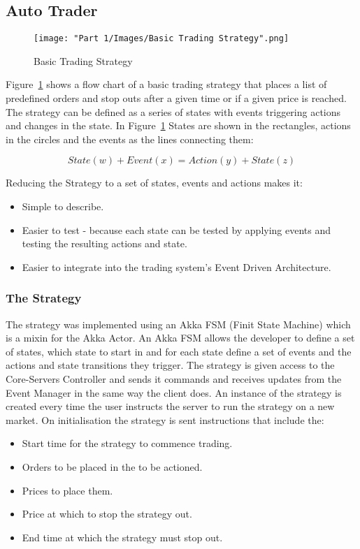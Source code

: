	\subsection{Auto Trader}
	\begin{figure}[H]
		\texttt{[image: "Part 1/Images/Basic Trading Strategy".png]}
		\centering
		\caption{Basic Trading Strategy}
    		\label{fig:basicTradingStrategy}
	\end{figure}	
	
	Figure~\ref{fig:basicTradingStrategy} shows a flow chart of a basic trading strategy that places a list of predefined orders and stop outs after a given time or if a given price is reached. The strategy can be defined as a series of states with events triggering actions and changes in the state. In Figure~\ref{fig:basicTradingStrategy} States are shown in the rectangles, actions in the circles and the events as the lines connecting them:
	
	$$ State(w) + Event(x) = Action(y) + State(z) $$
	
	Reducing the Strategy to a set of states, events and actions makes it:
		\begin{itemize}
			\item Simple to describe.
			\item Easier to test - because each state can be tested by applying events and testing the resulting actions and state.
			\item Easier to integrate into the trading system's Event Driven Architecture.
		\end{itemize}			

	\subsubsection{The Strategy}
	The strategy was implemented using an Akka FSM (Finit State Machine)\cite{AkkaFSM} which is a mixin for the Akka Actor. An Akka FSM allows the developer to define a set of states, which state to start in and for each state define a set of events and the actions and state transitions they trigger. The strategy is given access to the Core-Servers Controller and sends it commands and receives updates from the Event Manager in the same way the client does. An instance of the strategy is created every time the user instructs the server to run the strategy on a new market. On initialisation the strategy is sent instructions that include the:
		\begin{itemize}
			\item Start time for the strategy to commence trading.
			\item Orders to be placed in the to be actioned.
			\item Prices to place them.
			\item Price at which to stop the strategy out.
			\item End time at which the strategy must stop out.
		\end{itemize}
	
